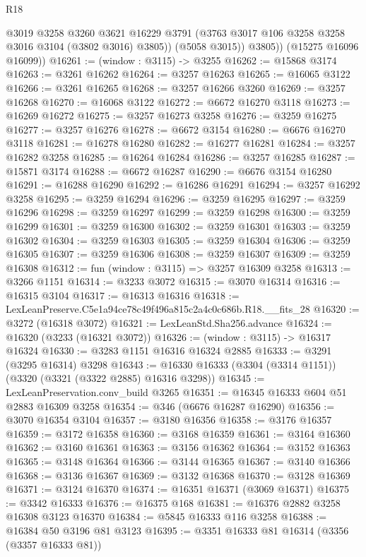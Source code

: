\begin{lexlean}{R18}
\begin{coremodule}
              @3019
              @3258
              @3260
              @3621
              @16229
              @3791
              (@3763 @3017 @106 @3258 @3258 @3016 @3104 (@3802 @3016) @3805))
            (@5058 @3015))
          @3805))
      (@15275 @16096 @16099))
@16261 := (window : @3115) -> @3255
@16262 := @15868 @3174
@16263 := @3261 @16262
@16264 := @3257 @16263
@16265 := @16065 @3122
@16266 := @3261 @16265
@16268 := @3257 @16266 @3260
@16269 := @3257 @16268
@16270 := @16068 @3122
@16272 := @6672 @16270 @3118
@16273 := @16269 @16272
@16275 := @3257 @16273 @3258
@16276 := @3259 @16275
@16277 := @3257 @16276
@16278 := @6672 @3154
@16280 := @6676 @16270 @3118
@16281 := @16278 @16280
@16282 := @16277 @16281
@16284 := @3257 @16282 @3258
@16285 := @16264 @16284
@16286 := @3257 @16285
@16287 := @15871 @3174
@16288 := @6672 @16287
@16290 := @6676 @3154 @16280
@16291 := @16288 @16290
@16292 := @16286 @16291
@16294 := @3257 @16292 @3258
@16295 := @3259 @16294
@16296 := @3259 @16295
@16297 := @3259 @16296
@16298 := @3259 @16297
@16299 := @3259 @16298
@16300 := @3259 @16299
@16301 := @3259 @16300
@16302 := @3259 @16301
@16303 := @3259 @16302
@16304 := @3259 @16303
@16305 := @3259 @16304
@16306 := @3259 @16305
@16307 := @3259 @16306
@16308 := @3259 @16307
@16309 := @3259 @16308
@16312 := fun (window : @3115) => @3257 @16309 @3258
@16313 := @3266 @1151
@16314 := @3233 @3072
@16315 := @3070 @16314
@16316 := @16315 @3104
@16317 := @16313 @16316
@16318 := LexLeanPreserve.C5e1a94ce78c49f496a815c2a4c0c686b.R18.__fits_28
@16320 := @3272 (@16318 @3072)
@16321 := LexLeanStd.Sha256.advance
@16324 := @16320 (@3233 (@16321 @3072))
@16326 := (window : @3115) -> @16317 @16324
@16330 := @3283 @1151 @16316 @16324 @2885
@16333 := @3291 (@3295 @16314) @3298
@16343 := @16330 @16333 (@3304 (@3314 @1151)) (@3320 (@3321 (@3322 @2885) @16316 @3298))
@16345 := LexLeanPreservation.conv_build @3265
@16351 := @16345 @16333 @604 @51 @2883 @16309 @3258
@16354 := @346 (@6676 @16287 @16290)
@16356 := @3070 @16354 @3104
@16357 := @3180 @16356
@16358 := @3176 @16357
@16359 := @3172 @16358
@16360 := @3168 @16359
@16361 := @3164 @16360
@16362 := @3160 @16361
@16363 := @3156 @16362
@16364 := @3152 @16363
@16365 := @3148 @16364
@16366 := @3144 @16365
@16367 := @3140 @16366
@16368 := @3136 @16367
@16369 := @3132 @16368
@16370 := @3128 @16369
@16371 := @3124 @16370
@16374 := @16351 @16371 (@3069 @16371)
@16375 := @3342 @16333
@16376 := @16375 @168
@16381 := @16376 @2882 @3258 @16308 @3123 @16370
@16384 := @5845 @16333 @116 @3258
@16388 := @16384 @50 @3196 @81 @3123
@16395 := @3351 @16333 @81 @16314 (@3356 (@3357 @16333 @81))

\end{coremodule}
\end{lexlean}
